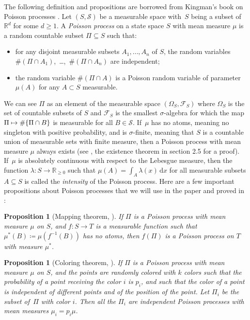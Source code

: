 \documentclass[JEP,XML,SOM,Unicode,published]{cedram}
\newcommand{\RR}{\mathbb{R}}
\newcommand{\riemint}[4]{\int_{#1}^{#2}\! #3 \, \mathrm{d}#4}
\theoremstyle{plain}
\newtheorem{prop}[cor]{Proposition}
\theoremstyle{definition}
\begin{document}
The following definition and propositions are borrowed from Kingman's book on Poisson processes \cite{Kingman93}. Let $(S, \mathcal S)$ be a measurable space with~$S$ being a subset of $\RR^d$ for some $d \ge 1$. A \textit{Poisson process} on a state space $S$ with mean measure $\mu$ is a random countable subset $\Pi \subseteq S$ such that:
\begin{itemize}
\item for any disjoint measurable subsets $A_1, \ldots, A_n$ of $S$, the random variables \hbox{$\#(\Pi \cap A_1)$, \dots, $\#(\Pi \cap A_n)$} are independent;

\item the random variable $\#(\Pi \cap A)$ is a Poisson random variable of parameter $\mu(A)$ for any $A\subset S$ measurable.
\end{itemize}
We can see $\Pi$ as an element of the measurable space $(\Omega_S, \mathcal F_S)$ where $\Omega_S$ is the set of countable subsets of $S$ and $\mathcal F_S$ is the smallest $\sigma$-algebra for which the map $\Pi \mapsto \#\{\Pi \cap\nobreak B\}$ is measurable for all $B \in \mathcal S$. If~$\mu$ has no atoms, meaning no singleton with positive probability, and is $\sigma$-finite, meaning that $S$ is a countable union of measurable sets with finite measure, then a Poisson process with mean measure $\mu$ always exists (see \cite{Kingman93}, the existence theorem in section 2.5 for a proof). If~$\mu$ is absolutely continuous with respect to the Lebesgue measure, then the function \hbox{$\lambda \colon S \to \RR_{\ge 0}$} such that $\mu(A) = \riemint{A}{}{\lambda(x)}{x}$ for all measurable subsets $A \subseteq S$ is called the \textit{intensity} of the Poisson process. Here are a few important propositions about Poisson processes that we will use in the paper and proved in \cite{Kingman93}:

\begin{prop}[Mapping theorem, {\cite[\S2.3]{Kingman93}}]
\label{prel:map}
If $\Pi$ is a Poisson process with mean measure $\mu$ on $S$, and $f:S \to T$ is a measurable function such that $\mu^*(B) \coloneqq \mu(f^{-1}(B))$ has no atoms, then $f(\Pi)$ is a Poisson process on $T$ with measure $\mu^*$.
\end{prop}

\begin{prop}[Coloring theorem, {\cite[\S5.1]{Kingman93}}]
\label{prel:color}
If $\Pi$ is a Poisson process with mean measure $\mu$ on $S$, and the points are randomly colored with $k$ colors such that the probability of a point receiving the color $i$ is $p_i$, and such that the color of a point is independent of different points and of the position of the point. Let $\Pi_i$ be the subset of~$\Pi$ with color $i$. Then all the $\Pi_i$ are independent Poisson processes with mean measures $\mu_i = p_i\mu$.
\end{prop}
\end{document}
